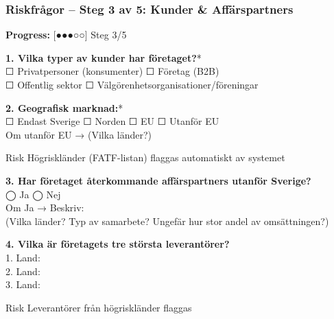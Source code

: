 \documentclass[10pt]{beamer}
\begin{document}
\begin{frame}[label=riskfragor-steg3]
  \frametitle{Riskfrågor – Steg 3 av 5: Kunder \& Affärspartners}

  \begin{center}
    \textbf{Progress:} [●●●○○] Steg 3/5
  \end{center}

  \vspace{0.3cm}

  \footnotesize

  \textbf{1. Vilka typer av kunder har företaget?}*\\
  ☐ Privatpersoner (konsumenter) \hspace{0.5cm} ☐ Företag (B2B)\\
  ☐ Offentlig sektor \hspace{0.5cm} ☐ Välgörenhetsorganisationer/föreningar

  \vspace{0.3cm}

  \textbf{2. Geografisk marknad:}*\\
  ☐ Endast Sverige \hspace{0.5cm} ☐ Norden \hspace{0.5cm} ☐ EU \hspace{0.5cm} ☐ Utanför EU\\
  Om utanför EU → \underline{\hspace{6cm}} (Vilka länder?)
  \begin{block}{Risk}
    \tiny Högriskländer (FATF-listan) flaggas automatiskt av systemet
  \end{block}

  \vspace{0.3cm}

  \textbf{3. Har företaget återkommande affärspartners utanför Sverige?}\\
  ◯ Ja \hspace{0.5cm} ◯ Nej\\
  Om Ja → Beskriv: \underline{\hspace{6cm}}\\
  \tiny (Vilka länder? Typ av samarbete? Ungefär hur stor andel av omsättningen?)

  \vspace{0.3cm}

  \textbf{4. Vilka är företagets tre största leverantörer?}\\
  1. \underline{\hspace{5cm}} Land: \underline{\hspace{2cm}}\\
  2. \underline{\hspace{5cm}} Land: \underline{\hspace{2cm}}\\
  3. \underline{\hspace{5cm}} Land: \underline{\hspace{2cm}}
  \begin{block}{Risk}
    \tiny Leverantörer från högriskländer flaggas
  \end{block}


\end{frame}
\end{document}
